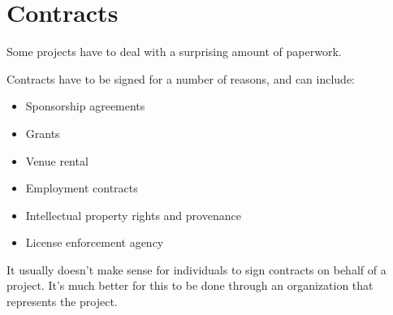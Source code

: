 


\chapter{Contracts}

Some projects have to deal with a surprising amount of paperwork.

Contracts have to be signed for a number of reasons, and can include:

\begin{itemize}

\item Sponsorship agreements

\item Grants

\item Venue rental

\item Employment contracts

\item Intellectual property rights and provenance

\item License enforcement agency

\end{itemize}

It usually doesn't make sense for individuals to sign contracts on behalf of a project.  It's much better for this to be done through an organization that represents the project.

